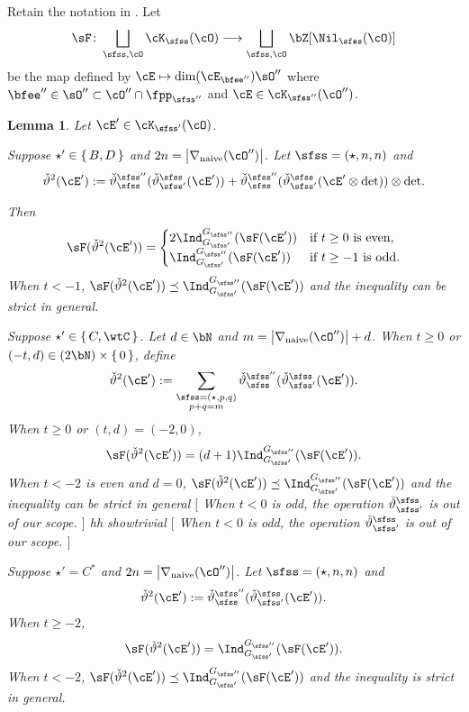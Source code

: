 \documentclass[12pt,a4paper]{amsart}
\newcommand{\trivial}[2][]{\if\relax\detokenize{#1}\relax
  {%
      \color{orange} \vspace{0em} $[$  #2 $]$
      \color{black}
  }
  \else
\ifx#1h
\ifcsname showtrivial\endcsname
{%
    \color{orange} \vspace{0em}  $[$ #2 $]$
    \color{black}
}
\fi
\else {\red Wrong argument!} \fi
\fi
}
\def\abs#1{\left|{#1}\right|}
\def\DD{\nabla}
\numberwithin{equation}{section}
\newtheorem{lem}[thm]{Lemma}
\theoremstyle{remark}
\def\DDn{\DD_{\mathrm{naive}}}
\def\cOpp{\cO^{\prime\prime}}
\begin{document}
Retain the notation in .
Let 
\[
  \sF\colon \bigsqcup_{\sfss,\cO} \cK_{\sfss}(\cO)\longrightarrow 
  \bigsqcup_{\sfss,\cO} \bZ[ \Nil_{\sfss}(\cO) ] 
  \]
  be the map defined  by $\cE \mapsto \dim (\cE_{\bfee''})\sO''$ where 
$\bfee''\in \sO'' \subset \cO''\cap \fpp_{\sfss''}$ and
$\cE\in \cK_{\sfss''}(\cO'')$.


\def\dblift{{\check \vartheta^2}}

\begin{lem}\label{lem:dblift} 
  Let  $\cE' \in \cK_{\sfss'}(\cO)$.
  \begin{enuma}
 \item Suppose $\star' \in \set{B,D}$ and  $2n = \abs{\DDn(\cOpp)}$.
 Let $\sfss = (\star, n,n)$ and 
 \[
   \dblift(\cE') := \dlift_{\sfss}^{\sfss''}(\dlift_{\sfss'}^{\sfss}(\cE'))
   + \dlift_{\sfss}^{\sfss''}(\dlift_{\sfss'}^{\sfss}
   (\cE' \otimes {\det}))\otimes {\det}.
   \]    

  Then     
  \[
    \sF(\dblift(\cE')) = \begin{cases}
     2 \indsss(\sF(\cE')) & \text{if $t\geq 0$ is even},\\ 
     \indsss(\sF(\cE')) & \text{if $t\geq -1$ is odd}.\\ 
    \end{cases}
  \]
  When $t <-1$, $\sF(\dblift(\cE')) \preceq \indsss(\sF(\cE'))$ and the inequality 
  can be strict in general.

 \item Suppose $\star' \in \set{C,\wtC}$. 
  Let $d\in \bN$ and $m = \abs{\DDn(\cOpp)}+d$.
  When $t\geq 0$ or $(-t,d) \in (2\bN)\times \set{0}$, define 
 \[
   \dblift(\cE') := 
   \sum_{\substack{\sfss = (\star,p,q)\\ p+q=m}}
   \dlift_{\sfss}^{\sfss''}(\dlift_{\sfss'}^{\sfss}(\cE')).
   \]    
   When $t\geq 0$ or $(t,d)=(-2,0)$,\\
  \[
    \sF(\dblift(\cE')) = (d+1) \indsss(\sF(\cE')).
  \]
   When $t< -2$ is even and $d=0$, 
    $\sF(\dblift(\cE')) \preceq \indsss(\sF(\cE'))$  and the inequality can be strict
    in general 
  \trivial[h]{
    When $t<0$ is odd, the operation $\dlift_{\sfss'}^{\sfss}$ is out 
    of our scope. 
  }

 \item Suppose $\star' = C^*$ and $2n = \abs{\DDn(\cOpp)}$. 
  Let $\sfss = (\star,n,n)$ and 
 \[
   \dblift(\cE') := 
      \dlift_{\sfss}^{\sfss''}(\dlift_{\sfss'}^{\sfss}(\cE')).
   \]    
  When $t\geq -2$, 
  \[
    \sF(\dblift(\cE')) = \indsss(\sF(\cE')). 
  \]
  When $t <-2$, $\sF(\dblift(\cE')) \preceq \indsss(\sF(\cE'))$ and the inequality 
  is strict in general.


\end{enuma}
\end{lem}
\end{document}
